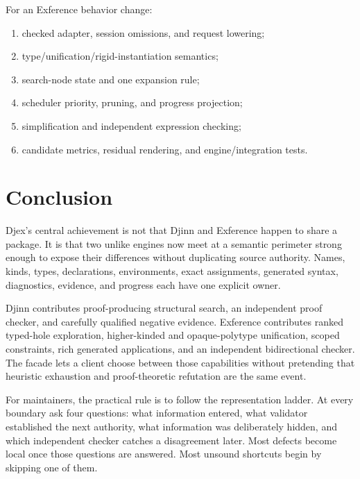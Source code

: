 \documentclass[10pt,letterpaper,oneside]{report}
\begin{document}
For an Exference behavior change:

\begin{enumerate}
  \item checked adapter, session omissions, and request lowering;
  \item type/unification/rigid-instantiation semantics;
  \item search-node state and one expansion rule;
  \item scheduler priority, pruning, and progress projection;
  \item simplification and independent expression checking;
  \item candidate metrics, residual rendering, and engine/integration tests.
\end{enumerate}

\chapter*{Conclusion}

Djex's central achievement is not that Djinn and Exference happen to share a package. It is that two unlike engines now meet at a semantic perimeter strong enough to expose their differences without duplicating source authority. Names, kinds, types, declarations, environments, exact assignments, generated syntax, diagnostics, evidence, and progress each have one explicit owner.

Djinn contributes proof-producing structural search, an independent proof checker, and carefully qualified negative evidence. Exference contributes ranked typed-hole exploration, higher-kinded and opaque-polytype unification, scoped constraints, rich generated applications, and an independent bidirectional checker. The facade lets a client choose between those capabilities without pretending that heuristic exhaustion and proof-theoretic refutation are the same event.

For maintainers, the practical rule is to follow the representation ladder. At every boundary ask four questions: what information entered, what validator established the next authority, what information was deliberately hidden, and which independent checker catches a disagreement later. Most defects become local once those questions are answered. Most unsound shortcuts begin by skipping one of them.
\end{document}
